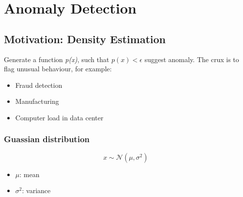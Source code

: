 \section{Anomaly Detection}
    \subsection{Motivation: Density Estimation}
        Generate a function \emph{p(x)}, such that $p(x) < \epsilon$ suggest anomaly. 
        The crux is to flag unusual behaviour, for example: 
        \begin{itemize}
            \item Fraud detection
            \item Manufacturing 
            \item Computer load in data center
        \end{itemize}

        \subsubsection{Guassian distribution}
            \begin{equation}
                x \sim \mathcal{N}(\mu, \sigma^2)
                \label{eq:guassian}
            \end{equation}

            \begin{itemize}
                \item $\mu$: mean
                \item $\sigma^2$: variance
            \end{itemize}


